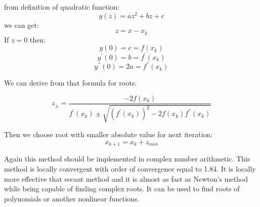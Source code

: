 from definition of quadratic function:
\[ y(z) = az^2 + bz + c \]
we can get:
\[ z = x - x_k \]
If $z = 0$ then:
\[ y(0) = c = f(x_k) \]
\[ y^{'}(0) = b = f^{'}(x_k) \]
\[ y^{''}(0) = 2a = f^{''}(x_k) \]

We can derive from that formula for roots:

\[ z_{\pm} = \frac{-2f(x_k)}{f^{'}(x_k) \pm \sqrt{ (f^{'}(x_k))^2 - 2f(x_k)f^{''}(x_k)}}\]

Then we choose root with smaller absolute value for next iteration:
\[ x_{k+1} = x_k + z_{min} \]

Again this method should be implemented in complex number arithmetic.
This method is locally convergent with order of convergence equal to 1.84. It is locally more effective that secant method and it is almost as fast as Newton's method while being capable of finding complex roots. It can be used to find roots of polynomials or another nonlinear functions.

